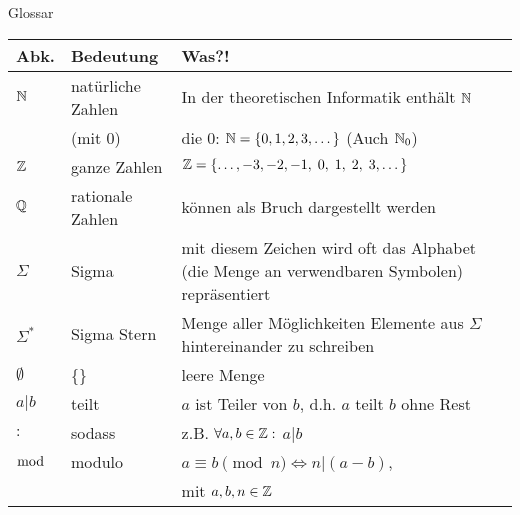 \begin{frame}[fragile]{Glossar}
	\small
	\begin{tabular}{p{} p{} p{}}
		\toprule
		Abk.&Bedeutung&Was?!\\
		\midrule
		$\mathbb{N}$&natürliche Zahlen&In der theoretischen Informatik enthält $\mathbb{N}$ \\ 
		&(mit 0)&die 0: $\mathbb{N}=\{0,1,2,3,\dots\}$ (Auch $\mathbb{N}_0$)\\
		$\mathbb{Z}$&ganze Zahlen& $\mathbb{Z}=\{\dots,-3,-2,-1,\;0,\;1,\;2,\;3,\dots\}$\\
		$\mathbb{Q}$&rationale Zahlen&können als Bruch dargestellt werden\\
		$\Sigma$ & Sigma& mit diesem Zeichen wird oft das Alphabet (die Menge an verwendbaren Symbolen) repräsentiert\\
		$\Sigma^\ast$&Sigma Stern&Menge aller Möglichkeiten Elemente aus $\Sigma$ hintereinander zu schreiben\\
		$\emptyset$&\{\}&leere Menge\\
		$a|b$&teilt& $a$ ist Teiler von $b$, d.h. $a$ teilt $b$ ohne Rest\\
		$:$&sodass&z.B. $\forall a,b\in\mathbb{Z}:$ $a|b$\\
		$\bmod$&modulo& $a\equiv b \pmod n \iff n|(a-b)$,\\
		&& mit $a,b,n\in\mathbb{Z}$\\
		\bottomrule
	\end{tabular}
\end{frame}